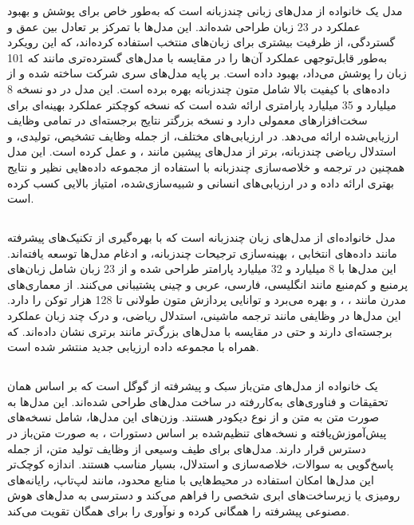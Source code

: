 \documentclass[11pt, a4paper, oneside]{book}
\begin{document}
				مدل  یک خانواده از مدل‌های زبانی چندزبانه است که به‌طور خاص برای پوشش و بهبود عملکرد در 23 زبان طراحی شده‌اند. این مدل‌ها با تمرکز بر تعادل بین عمق و گستردگی، از ظرفیت بیشتری برای زبان‌های منتخب استفاده کرده‌اند، که این رویکرد به‌طور قابل‌توجهی عملکرد آن‌ها را در مقایسه با مدل‌های گسترده‌تری مانند  که 101 زبان را پوشش می‌داد، بهبود داده است.  بر پایه مدل‌های سری  شرکت  ساخته شده و از داده‌های  با کیفیت بالا شامل متون چندزبانه بهره برده است. این مدل در دو نسخه 8 میلیارد و 35 میلیارد پارامتری ارائه شده است که نسخه کوچکتر  عملکرد بهینه‌ای برای سخت‌افزارهای معمولی دارد و نسخه بزرگتر  نتایج برجسته‌ای در تمامی وظایف ارزیابی‌شده ارائه می‌دهد.  در ارزیابی‌های مختلف، از جمله وظایف تشخیص، تولیدی، و استدلال ریاضی چندزبانه، برتر از مدل‌های پیشین مانند ،  و  عمل کرده است. این مدل همچنین در ترجمه و خلاصه‌سازی چندزبانه با استفاده از مجموعه داده‌هایی نظیر  و  نتایج بهتری ارائه داده و در ارزیابی‌های انسانی و شبیه‌سازی‌شده، امتیاز بالایی کسب کرده است.  \cite{aryabumi_aya_2024}
		
			\subsection{} \label{aya-expanse-8b}
				
				مدل  خانواده‌ای از مدل‌های زبان چندزبانه است که با بهره‌گیری از تکنیک‌های پیشرفته مانند داده‌های انتخابی ، بهینه‌سازی ترجیحات چندزبانه، و ادغام مدل‌ها توسعه یافته‌اند. این مدل‌ها با 8 میلیارد و 32 میلیارد پارامتر طراحی شده و از 23 زبان شامل زبان‌های پرمنبع و کم‌منبع مانند انگلیسی، فارسی، عربی و چینی پشتیبانی می‌کنند.  از معماری‌های مدرن مانند ، ، و  بهره می‌برد و توانایی پردازش متون طولانی تا 128 هزار توکن را دارد. این مدل‌ها در وظایفی مانند ترجمه ماشینی، استدلال ریاضی، و درک چند زبان عملکرد برجسته‌ای دارند و حتی در مقایسه با مدل‌های بزرگ‌تر مانند  برتری نشان داده‌اند.  که همراه با مجموعه داده ارزیابی جدید  منتشر شده است. 	\cite{dang_aya_2024}
		
			\subsection{} \label{gemma-2-2b-it}
				
				یک خانواده از مدل‌های متن‌باز سبک و پیشرفته از گوگل است که بر اساس همان تحقیقات و فناوری‌های به‌کاررفته در ساخت مدل‌های  طراحی شده‌اند. این مدل‌ها به صورت متن به متن و از نوع دیکودر هستند. وزن‌های این مدل‌ها، شامل نسخه‌های پیش‌آموزش‌یافته و نسخه‌های تنظیم‌شده بر اساس دستورات ، به صورت متن‌باز در دسترس قرار دارند. مدل‌های  برای طیف وسیعی از وظایف تولید متن، از جمله پاسخ‌گویی به سوالات، خلاصه‌سازی و استدلال، بسیار مناسب هستند. اندازه کوچک‌تر این مدل‌ها امکان استفاده در محیط‌هایی با منابع محدود، مانند لپ‌تاپ، رایانه‌های رومیزی یا زیرساخت‌های ابری شخصی را فراهم می‌کند و دسترسی به مدل‌های هوش مصنوعی پیشرفته را همگانی کرده و نوآوری را برای همگان تقویت می‌کند.
		
\end{document}
